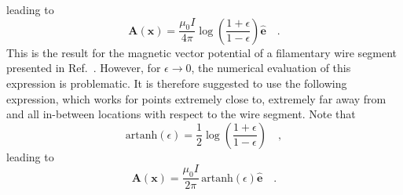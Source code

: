 leading to
\begin{equation}
 \mathbf{A}(\mathbf{x}) = \frac{\mu_0 I}{4 \pi} \log\left(\frac{1 + \epsilon}{1 - \epsilon} \right) \hat{\mathbf{e}} \quad . \label{eqn:A_log_eps}
\end{equation}
This is the result for the magnetic vector potential of a filamentary wire segment presented in Ref.~\cite{hanson_hirshman_2002}.
However, for $\epsilon \rightarrow 0$, the numerical evaluation of this expression is problematic.
It is therefore suggested to use the following expression, which works for points extremely close to,
extremely far away from and all in-between locations with respect to the wire segment.
Note that
\begin{equation}
 \mathrm{artanh}\left( \epsilon \right) = \frac{1}{2} \log\left(\frac{1 + \epsilon}{1 - \epsilon} \right) \quad ,
\end{equation}
leading to
\begin{equation}
 \boxed{\mathbf{A}(\mathbf{x}) = \frac{\mu_0 I}{2 \pi} \, \mathrm{artanh} \left( \epsilon \right) \hat{\mathbf{e}}} \quad . \label{eqn:A_artanh}
\end{equation}

